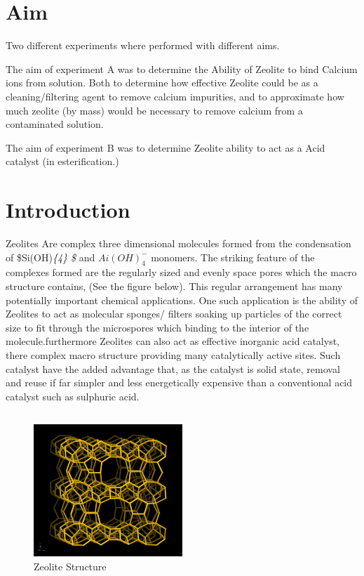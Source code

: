 \documentclass[]{article}
\begin{document}
\hypertarget{aim}{%
\section{Aim}\label{aim}}

Two different experiments where performed with different aims.

The aim of experiment A was to determine the Ability of Zeolite to bind
Calcium ions from solution. Both to determine how effective Zeolite
could be as a cleaning/filtering agent to remove calcium impurities, and
to approximate how much zeolite (by mass) would be necessary to remove
calcium from a contaminated solution.

The aim of experiment B was to determine Zeolite ability to act as a
Acid catalyst (in esterification.)

\hypertarget{introduction}{%
\section{Introduction}\label{introduction}}

Zeolites Are complex three dimensional molecules formed from the
condensation of \$Si(OH)\emph{\{4\} \$} and \(Ai(OH)^{-}_{4}\) monomers.
The striking feature of the complexes formed are the regularly sized and
evenly space pores which the macro structure contains, (See the figure
below). This regular arrangement has many potentially important chemical
applications. One such application is the ability of Zeolites to act as
molecular sponges/ filters soaking up particles of the correct size to
fit through the microspores which binding to the interior of the
molecule.furthermore Zeolites can also act as effective inorganic acid
catalyst, there complex macro structure providing many catalytically
active sites. Such catalyst have the added advantage that, as the
catalyst is solid state, removal and reuse if far simpler and less
energetically expensive than a conventional acid catalyst such as
sulphuric acid.

\hypertarget{section}{%
\subsection{}\label{section}}

\begin{figure}
\centering
\includegraphics[width=0.5\textwidth,height=\textheight]{Images/ZeoliteStructure.jpg}
\caption{Zeolite Structure}
\end{figure}
\end{document}

